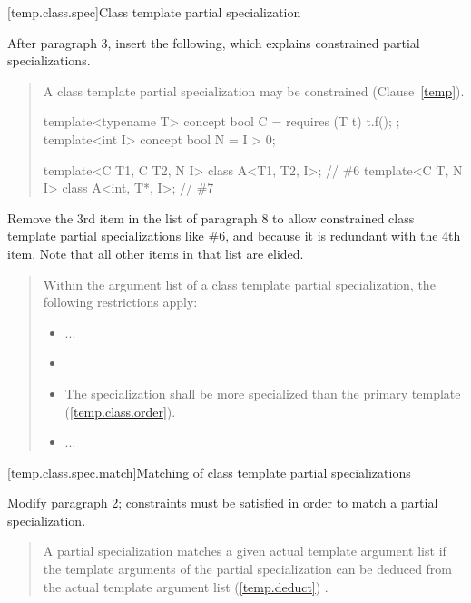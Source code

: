[temp.class.spec]{Class template partial specialization}

After paragraph 3, insert the following, which explains constrained partial 
specializations.

\begin{quote}
\begin{addedblock}
\setcounter{Paras}{3}
\pnum
A class template partial specialization may be constrained
(Clause~\ref{temp}).
\enterexample
\begin{codeblock}
template<typename T> concept bool C = requires (T t) { t.f(); };
template<int I> concept bool N = I > 0;

template<C T1, C T2, N I> class A<T1, T2, I>;  // \#6
template<C T, N I>        class A<int, T*, I>; // \#7
\end{codeblock}
\exitexample
\end{addedblock}
\end{quote}

Remove the 3rd item in the list of paragraph 8 to allow constrained class 
template partial specializations like \#6, and because it is redundant with 
the 4th item. Note that all other items in that list are elided.

\begin{quote}
\setcounter{Paras}{7}
Within the argument list of a class template partial specialization, 
the following restrictions apply:
\begin{itemize}
\item ...

\item {}

\item The specialization shall be more specialized than the primary
template (\ref{temp.class.order}).

\item ...
\end{itemize}
\end{quote}
 
[temp.class.spec.match]{Matching of class template partial specializations}

Modify paragraph 2; constraints must be satisfied in order
to match a partial specialization. 

\begin{quote}
\setcounter{Paras}{1}
\pnum
A partial specialization matches a given actual template argument list if 
the template arguments of the partial specialization can be deduced from the 
actual template argument list (\ref{temp.deduct}) .
\end{quote}

